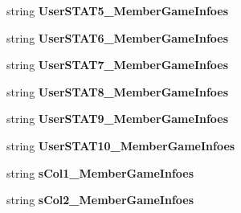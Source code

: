 \begin{DoxyCompactItemize}
\item 
string {\bfseries User\+S\+T\+A\+T5\+\_\+\+Member\+Game\+Infoes}\hypertarget{a00004_a99a866f1ef4aa3152e33f4c92672cee0}{}\label{a00004_a99a866f1ef4aa3152e33f4c92672cee0}

\item 
string {\bfseries User\+S\+T\+A\+T6\+\_\+\+Member\+Game\+Infoes}\hypertarget{a00004_a9e529a7a6221abba94686b289d5f5db7}{}\label{a00004_a9e529a7a6221abba94686b289d5f5db7}

\item 
string {\bfseries User\+S\+T\+A\+T7\+\_\+\+Member\+Game\+Infoes}\hypertarget{a00004_ae53199683162dd4248994740dc344a5d}{}\label{a00004_ae53199683162dd4248994740dc344a5d}

\item 
string {\bfseries User\+S\+T\+A\+T8\+\_\+\+Member\+Game\+Infoes}\hypertarget{a00004_aa53728043438e887deccde7720954c2c}{}\label{a00004_aa53728043438e887deccde7720954c2c}

\item 
string {\bfseries User\+S\+T\+A\+T9\+\_\+\+Member\+Game\+Infoes}\hypertarget{a00004_ad8457c16c9e9b932252966e6e8383a2f}{}\label{a00004_ad8457c16c9e9b932252966e6e8383a2f}

\item 
string {\bfseries User\+S\+T\+A\+T10\+\_\+\+Member\+Game\+Infoes}\hypertarget{a00004_a434de37216882dc7c42ee2584dede56c}{}\label{a00004_a434de37216882dc7c42ee2584dede56c}

\item 
string {\bfseries s\+Col1\+\_\+\+Member\+Game\+Infoes}\hypertarget{a00004_ad46e5eb03b0633786f283b2453e492b3}{}\label{a00004_ad46e5eb03b0633786f283b2453e492b3}

\item 
string {\bfseries s\+Col2\+\_\+\+Member\+Game\+Infoes}\hypertarget{a00004_a5cfa081643479921d91a3286e086b8cf}{}\label{a00004_a5cfa081643479921d91a3286e086b8cf}


\end{DoxyCompactItemize}
